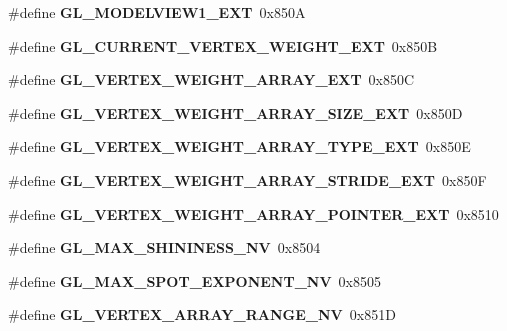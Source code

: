 \begin{DoxyCompactItemize}
\item 
\#define {\bfseries G\+L\+\_\+\+M\+O\+D\+E\+L\+V\+I\+E\+W1\+\_\+\+E\+X\+T}~0x850\+A\label{_s_d_l__opengl_8h_a270cba62cd911b9ebdd13720844d00cd}

\item 
\#define {\bfseries G\+L\+\_\+\+C\+U\+R\+R\+E\+N\+T\+\_\+\+V\+E\+R\+T\+E\+X\+\_\+\+W\+E\+I\+G\+H\+T\+\_\+\+E\+X\+T}~0x850\+B\label{_s_d_l__opengl_8h_a4a08496aa30c806e8c0bf14192db91c7}

\item 
\#define {\bfseries G\+L\+\_\+\+V\+E\+R\+T\+E\+X\+\_\+\+W\+E\+I\+G\+H\+T\+\_\+\+A\+R\+R\+A\+Y\+\_\+\+E\+X\+T}~0x850\+C\label{_s_d_l__opengl_8h_a7058ed209421bfa7d420cde9bf226966}

\item 
\#define {\bfseries G\+L\+\_\+\+V\+E\+R\+T\+E\+X\+\_\+\+W\+E\+I\+G\+H\+T\+\_\+\+A\+R\+R\+A\+Y\+\_\+\+S\+I\+Z\+E\+\_\+\+E\+X\+T}~0x850\+D\label{_s_d_l__opengl_8h_ac4118692640456a97e69e586396c7400}

\item 
\#define {\bfseries G\+L\+\_\+\+V\+E\+R\+T\+E\+X\+\_\+\+W\+E\+I\+G\+H\+T\+\_\+\+A\+R\+R\+A\+Y\+\_\+\+T\+Y\+P\+E\+\_\+\+E\+X\+T}~0x850\+E\label{_s_d_l__opengl_8h_a8d3470c8d07104d3582ba61741b7a07d}

\item 
\#define {\bfseries G\+L\+\_\+\+V\+E\+R\+T\+E\+X\+\_\+\+W\+E\+I\+G\+H\+T\+\_\+\+A\+R\+R\+A\+Y\+\_\+\+S\+T\+R\+I\+D\+E\+\_\+\+E\+X\+T}~0x850\+F\label{_s_d_l__opengl_8h_a8e6e4e896fab760a5ca189ab7cb57a3a}

\item 
\#define {\bfseries G\+L\+\_\+\+V\+E\+R\+T\+E\+X\+\_\+\+W\+E\+I\+G\+H\+T\+\_\+\+A\+R\+R\+A\+Y\+\_\+\+P\+O\+I\+N\+T\+E\+R\+\_\+\+E\+X\+T}~0x8510\label{_s_d_l__opengl_8h_a982241a9bdad1a35fe564f8facce923e}

\item 
\#define {\bfseries G\+L\+\_\+\+M\+A\+X\+\_\+\+S\+H\+I\+N\+I\+N\+E\+S\+S\+\_\+\+N\+V}~0x8504\label{_s_d_l__opengl_8h_a4edd502e0f153e799da5db454f6f12cd}

\item 
\#define {\bfseries G\+L\+\_\+\+M\+A\+X\+\_\+\+S\+P\+O\+T\+\_\+\+E\+X\+P\+O\+N\+E\+N\+T\+\_\+\+N\+V}~0x8505\label{_s_d_l__opengl_8h_a6507ce80d640aaac79cb2553697ce968}

\item 
\#define {\bfseries G\+L\+\_\+\+V\+E\+R\+T\+E\+X\+\_\+\+A\+R\+R\+A\+Y\+\_\+\+R\+A\+N\+G\+E\+\_\+\+N\+V}~0x851\+D\label{_s_d_l__opengl_8h_a102fc5a5c74942cad3681df6cffc01ca}


\end{DoxyCompactItemize}
